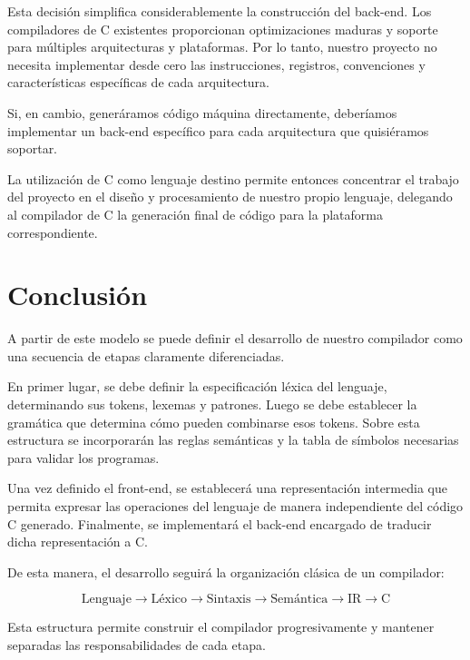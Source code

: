 \documentclass[11pt,a4paper]{article}
\begin{document}
Esta decisión simplifica considerablemente la construcción del back-end.
Los compiladores de C existentes proporcionan optimizaciones maduras y
soporte para múltiples arquitecturas y plataformas. Por lo tanto, nuestro
proyecto no necesita implementar desde cero las instrucciones, registros,
convenciones y características específicas de cada arquitectura.

Si, en cambio, generáramos código máquina directamente, deberíamos
implementar un back-end específico para cada arquitectura que quisiéramos
soportar.

La utilización de C como lenguaje destino permite entonces concentrar el
trabajo del proyecto en el diseño y procesamiento de nuestro propio
lenguaje, delegando al compilador de C la generación final de código para
la plataforma correspondiente.

\section{Conclusión}

A partir de este modelo se puede definir el desarrollo de nuestro compilador
como una secuencia de etapas claramente diferenciadas.

En primer lugar, se debe definir la especificación léxica del lenguaje,
determinando sus tokens, lexemas y patrones. Luego se debe establecer la
gramática que determina cómo pueden combinarse esos tokens. Sobre esta
estructura se incorporarán las reglas semánticas y la tabla de símbolos
necesarias para validar los programas.

Una vez definido el front-end, se establecerá una representación intermedia
que permita expresar las operaciones del lenguaje de manera independiente
del código C generado. Finalmente, se implementará el back-end encargado de
traducir dicha representación a C.

De esta manera, el desarrollo seguirá la organización clásica de un
compilador:

\[
\boxed{
\text{Lenguaje}
\rightarrow
\text{Léxico}
\rightarrow
\text{Sintaxis}
\rightarrow
\text{Semántica}
\rightarrow
\text{IR}
\rightarrow
\text{C}
}
\]

Esta estructura permite construir el compilador progresivamente y mantener
separadas las responsabilidades de cada etapa.
\end{document}
